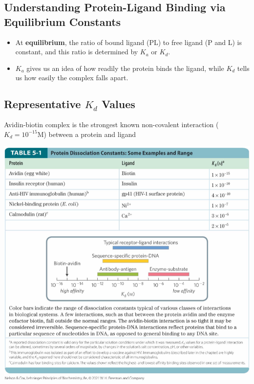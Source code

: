 \documentclass[10pt]{article}
\begin{document}
\subsection*{Understanding Protein-Ligand Binding via Equilibrium Constants}
\begin{itemize}
    \item At \textbf{equilibrium}, the ratio of bound ligand (PL) to free ligand (P and L) is constant, and this ratio is determined by $K_a$ or $K_d$.
    \item $K_a$ gives us an idea of how readily the protein binds the ligand, while $K_d$ tells us how easily the complex falls apart.
\end{itemize}

\subsection*{Representative $K_d$ Values}
Avidin-biotin complex is the strongest known non-covalent interaction ($K_d = 10^{-15}$M) between a protein and ligand
\begin{center}
    \includegraphics*[width=\textwidth]{L2_7.png}
\end{center}
\end{document}
